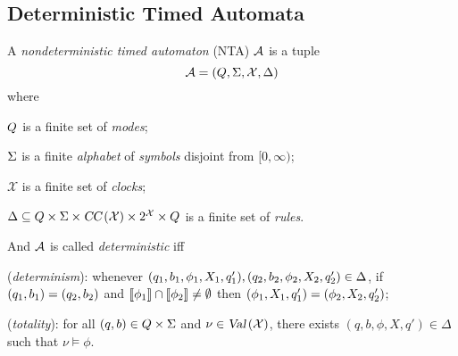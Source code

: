 \subsection{Deterministic Timed Automata}
\begin{definition}
A \emph{nondeterministic timed automaton} (NTA) $\mathcal{A}$ is a tuple
\begin{equation}\label{eq:nta}
\mathcal{A}=(Q,\Sigma,\mathcal{X},\Delta)
\end{equation}
where
\begin{compactitem}
\item $Q$ is a finite set of \emph{modes}; %
\item $\Sigma$ is a finite \emph{alphabet} of \emph{symbols} disjoint from $[0,\infty)$;
\item $\mathcal{X}$ is a finite set of \emph{clocks};
\item $\Delta\subseteq Q\times\Sigma\times\mbox{\sl CC}\left(\mathcal{X}\right)\times 2^{\mathcal{X}}\times Q$ is a finite set of \emph{rules}.
\end{compactitem}

And $\mathcal{A}$ is called \emph{deterministic} iff
\begin{compactenum}
\item ({\em determinism}): whenever $(q_1,b_1,\phi_1,X_1,q'_1),(q_2,b_2,\phi_2,X_2,q'_2)\in\Delta$, if $(q_1,b_1)=(q_2,b_2)$ and ${\llbracket}{\phi_1}{\rrbracket}\cap {\llbracket}{\phi_2}{\rrbracket}\ne\emptyset$ then $(\phi_1,X_1,q'_1)=(\phi_2,X_2,q'_2)$;
\item ({\em totality}): for all $(q,b)\in Q\times\Sigma$ and $\nu\in\mbox{\sl Val}\left(\mathcal{X}\right)$, there exists $(q,b,\phi,X,q')\in\Delta$ such that $\nu\models \phi$.
\end{compactenum}
\end{definition}

